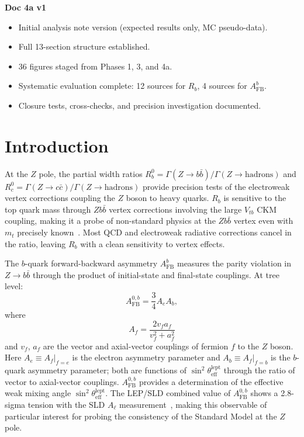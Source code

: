 \documentclass[11pt,a4paper]{article}
\begin{document}
\textbf{Doc 4a v1}
\begin{itemize}
\item Initial analysis note version (expected results only, MC pseudo-data).
\item Full 13-section structure established.
\item 36 figures staged from Phases 1, 3, and 4a.
\item Systematic evaluation complete: 12 sources for $R_b$, 4 sources for $A_\mathrm{FB}^b$.
\item Closure tests, cross-checks, and precision investigation documented.
\end{itemize}

\clearpage

\FloatBarrier
{}
\section{Introduction}
\label{sec:intro}

At the $Z$ pole, the partial width ratios $R_b^0 = \Gamma(Z \to b\bar{b})/\Gamma(Z \to \mathrm{hadrons})$
and $R_c^0 = \Gamma(Z \to c\bar{c})/\Gamma(Z \to \mathrm{hadrons})$ provide precision tests of
the electroweak vertex corrections coupling the $Z$ boson to heavy quarks.
$R_b$ is sensitive to the top quark mass through $Zb\bar{b}$ vertex corrections involving
the large $V_{tb}$ CKM coupling, making it a probe of non-standard physics at the
$Zb\bar{b}$ vertex even with $m_t$ precisely known~\cite{ALEPH:Rb:1996, LEP:EWWG:2005}.
Most QCD and electroweak radiative corrections cancel in the ratio, leaving $R_b$
with a clean sensitivity to vertex effects.

The $b$-quark forward-backward asymmetry $A_\mathrm{FB}^b$ measures the parity violation
in $Z \to b\bar{b}$ through the product of initial-state and final-state couplings.
At tree level:
\begin{equation}
A_\mathrm{FB}^{0,b} = \frac{3}{4} A_e A_b,
\label{eq:afb_tree}
\end{equation}
where
\begin{equation}
A_f = \frac{2 v_f a_f}{v_f^2 + a_f^2}
\label{eq:asymmetry_param}
\end{equation}
and $v_f$, $a_f$ are the vector and axial-vector couplings of fermion $f$ to the $Z$ boson.
Here $A_e \equiv A_f|_{f=e}$ is the electron asymmetry parameter and
$A_b \equiv A_f|_{f=b}$ is the $b$-quark asymmetry parameter; both are functions of
$\sin^2\theta_\mathrm{eff}^\mathrm{lept}$ through the ratio of vector to axial-vector couplings.
$A_\mathrm{FB}^{0,b}$ provides a determination of the effective weak mixing angle
$\sin^2\theta_\mathrm{eff}^\mathrm{lept}$.  The LEP/SLD combined value of $A_\mathrm{FB}^{0,b}$
shows a 2.8-sigma tension with the SLD $A_\ell$ measurement~\cite{LEP:EWWG:2005},
making this observable of particular interest for probing the consistency of the
Standard Model at the $Z$ pole.
\end{document}
